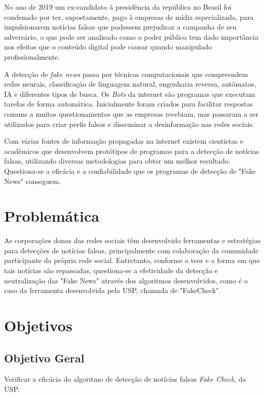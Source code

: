 No ano de 2019 um ex-candidato à presidência da república no Brasil foi condenado por ter, supostamente, pago à empresas de mídia especializada, para impulsionarem notícias falsas que pudessem prejudicar a campanha de seu adversário, o que pode ser analisado como o poder público tem dado importância nos efeitos que o conteúdo digital pode causar quando manipulado profissionalmente\cite{Folha-multa-haddad,Globo-multa-haddad,Veja-multa-haddad}.

A detecção de \textit{fake news} passa por técnicas computacionais que compreendem redes neurais, classificação de linguagem natural, engenharia reversa, autômatos, IA e diferentes tipos de busca. Os \textit{Bots} da internet são programas que executam tarefas de forma automática. Inicialmente foram criados para facilitar respostas comuns a muitos questionamentos que as empresas recebiam, mas passaram a ser utilizados para criar perfis falsos e disseminar a desinformação nas redes sociais\cite{bots-na-internet}.

Com várias fontes de informação propagadas na internet existem cientistas e  acadêmicos que desenvolvem protótipos de programas para a detecção de notícias falsas, utilizando diversas metodologias para obter um melhor resultado. Questiona-se a eficácia e a confiabilidade que os programas de detecção de "Fake News" conseguem.


 
\chapter{Problemática}

As corporações donas das redes sociais têm desenvolvido ferramentas e estratégias para detecções de notícias falsas, principalmente com colaboração da comunidade participante da própria rede social. Entretanto, conforme o teor e a forma em que tais notícias são repassadas, questiona-se a efetividade da detecção e neutralização das "Fake News" através dos algoritmos desenvolvidos, como é o caso da ferramenta desenvolvida pela USP, chamada de "FakeCheck".

\chapter{Objetivos}

\section{Objetivo Geral}
Verificar a eficácia do algoritmo de detecção de notícias falsas \textit{Fake Check}, da USP.

